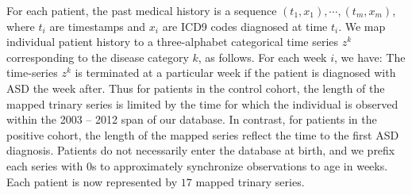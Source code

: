 \documentclass[3p,super,numbers,sort&compress,preprint,10pt]{elsarticle}
\newif\ifFIGS
\gdef\treatment{positive\xspace}
\begin{document}
For each patient, the past  medical history is a sequence $(t_1,x_1),\cdots,(t_m,x_m)$, where $t_i$ are timestamps and $x_i$ are ICD9 codes diagnosed at time $t_i$.  We map individual patient history to a three-alphabet categorical time series $z^k$ corresponding to the disease category $k$,  as follows. For each week $i$, we have: 
\noindent
                The time-series $z^k$ is terminated at a particular week if the patient is diagnosed with ASD the week after. Thus for patients in the control cohort, the length of the mapped trinary series is limited by the time for which the individual is observed within the  2003 -- 2012 span of our database. In contrast, for patients in  the \treatment cohort, the length of the mapped series reflect the time to the first ASD diagnosis. Patients do not necessarily enter the database at birth, and we prefix each series with 0s to  approximately synchronize observations to age in weeks. Each patient is now represented by $17$ mapped trinary series.
\ifFIGS
\end{document}
